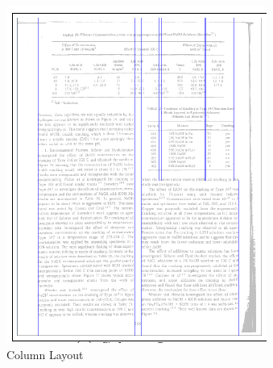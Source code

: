 \begin{figure}[H]
\hspace*{\fill} %
\begin{subfigure}{0.31\textwidth}
\includegraphics[width=\linewidth]{img/tableDetectionColumns.pdf}
\caption{Column Layout} \label{fig:1a}
\end{subfigure}
\hspace*{\fill} %
\begin{subfigure}{0.31\textwidth}

\end{subfigure}
\end{figure}
